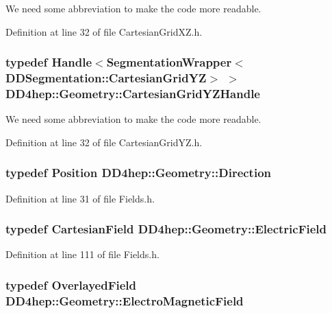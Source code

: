 We need some abbreviation to make the code more readable. 

Definition at line 32 of file CartesianGridXZ.h.\hypertarget{namespace_d_d4hep_1_1_geometry_afd3542602caa1ff9674c251a7747b0f6}{
\subsubsection[{CartesianGridYZHandle}]{\setlength{\rightskip}{0pt plus 5cm}typedef {\bf Handle}$<${\bf SegmentationWrapper}$<${\bf DDSegmentation::CartesianGridYZ}$>$ $>$ {\bf DD4hep::Geometry::CartesianGridYZHandle}}}
\label{namespace_d_d4hep_1_1_geometry_afd3542602caa1ff9674c251a7747b0f6}


We need some abbreviation to make the code more readable. 

Definition at line 32 of file CartesianGridYZ.h.\hypertarget{namespace_d_d4hep_1_1_geometry_a56730a0ddb9f3f089c415cd693bd7c19}{
\subsubsection[{Direction}]{\setlength{\rightskip}{0pt plus 5cm}typedef {\bf Position} {\bf DD4hep::Geometry::Direction}}}
\label{namespace_d_d4hep_1_1_geometry_a56730a0ddb9f3f089c415cd693bd7c19}


Definition at line 31 of file Fields.h.\hypertarget{namespace_d_d4hep_1_1_geometry_a2562a0506900761fa410a92b8d41e665}{
\subsubsection[{ElectricField}]{\setlength{\rightskip}{0pt plus 5cm}typedef {\bf CartesianField} {\bf DD4hep::Geometry::ElectricField}}}
\label{namespace_d_d4hep_1_1_geometry_a2562a0506900761fa410a92b8d41e665}


Definition at line 111 of file Fields.h.\hypertarget{namespace_d_d4hep_1_1_geometry_a6c49b16dfc8e9487329bfa3b45329f63}{
\subsubsection[{ElectroMagneticField}]{\setlength{\rightskip}{0pt plus 5cm}typedef {\bf OverlayedField} {\bf DD4hep::Geometry::ElectroMagneticField}}}
\label{namespace_d_d4hep_1_1_geometry_a6c49b16dfc8e9487329bfa3b45329f63}


